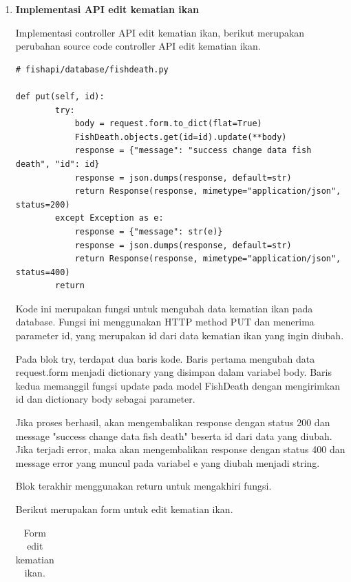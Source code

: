 \begin{enumerate}[1.]
response json:

\begin{lstlisting}
{
  "message": "success add fishdeath",
  "id": "62b9adfa793e0f39dbaa1739"
}
\end{lstlisting}




\item \textbf{Implementasi API edit kematian ikan}

Implementasi controller API edit kematian ikan, berikut merupakan perubahan source code controller API edit kematian ikan.

\begin{lstlisting}
# fishapi/database/fishdeath.py

def put(self, id):
        try:
            body = request.form.to_dict(flat=True)
            FishDeath.objects.get(id=id).update(**body)
            response = {"message": "success change data fish death", "id": id}
            response = json.dumps(response, default=str)
            return Response(response, mimetype="application/json", status=200)
        except Exception as e:
            response = {"message": str(e)}
            response = json.dumps(response, default=str)
            return Response(response, mimetype="application/json", status=400)
        return
\end{lstlisting}

Kode ini merupakan fungsi untuk mengubah data kematian ikan pada database. Fungsi ini menggunakan HTTP method PUT dan menerima parameter id, yang merupakan id dari data kematian ikan yang ingin diubah.

Pada blok try, terdapat dua baris kode. Baris pertama mengubah data request.form menjadi dictionary yang disimpan dalam variabel body. Baris kedua memanggil fungsi update pada model FishDeath dengan mengirimkan id dan dictionary body sebagai parameter.

Jika proses berhasil, akan mengembalikan response dengan status 200 dan message "success change data fish death" beserta id dari data yang diubah. Jika terjadi error, maka akan mengembalikan response dengan status 400 dan message error yang muncul pada variabel e yang diubah menjadi string.

Blok terakhir menggunakan return untuk mengakhiri fungsi.

Berikut merupakan form untuk edit kematian ikan.

\begin{longtable}{| l | p{5cm} | p{5cm} |}
\caption{Form edit kematian ikan.\label{table:form_edit_kematian_ikan}}\\


\end{longtable}
\end{enumerate}
